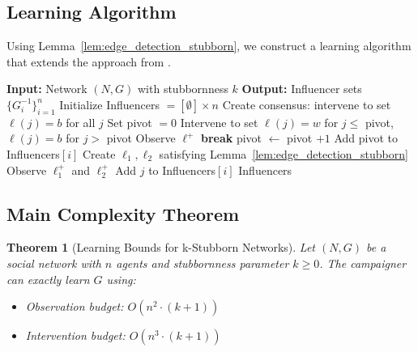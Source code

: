 \documentclass[conference]{IEEEtran}
\newtheorem{theorem}{Theorem}
\begin{document}
\subsection{Learning Algorithm}

Using Lemma~\ref{lem:edge_detection_stubborn}, we construct a learning algorithm that extends the approach from \cite{chistikov2020convergence}.

\begin{algorithm}[t]
\caption{Learning k-Stubborn Networks}
\label{alg:stubborn_learning}
\begin{algorithmic}[1]
\State \textbf{Input:} Network $(N,G)$ with stubbornness $k$
\State \textbf{Output:} Influencer sets $\{G_i^{-1}\}_{i=1}^n$
\State Initialize Influencers $= [\emptyset] \times n$
    \State Create consensus: intervene to set $\ell(j) = b$ for all $j$
    \State Set pivot $= 0$
    \Repeat
        \State Intervene to set $\ell(j) = w$ for $j \leq$ pivot, $\ell(j) = b$ for $j >$ pivot
        \State Observe $\ell^+$
            \State \textbf{break} 
        \EndIf
        \State pivot $\leftarrow$ pivot $+ 1$
        \State Add pivot to Influencers$[i]$
            \State Create $\ell_1, \ell_2$ satisfying Lemma~\ref{lem:edge_detection_stubborn}
            \State Observe $\ell_1^+$ and $\ell_2^+$
                \State Add $j$ to Influencers$[i]$
            \EndIf
        \EndFor
    \EndIf
\EndFor
\State \Return Influencers
\end{algorithmic}
\end{algorithm}

\subsection{Main Complexity Theorem}

\begin{theorem}[Learning Bounds for k-Stubborn Networks]
\label{thm:main_stubborn}
Let $(N, G)$ be a social network with $n$ agents and stubbornness parameter $k \geq 0$. The campaigner can exactly learn $G$ using:
\begin{itemize}
\item Observation budget: $O(n^2 \cdot (k + 1))$
\item Intervention budget: $O(n^3 \cdot (k + 1))$
\end{itemize}
\end{theorem}
\end{document}

